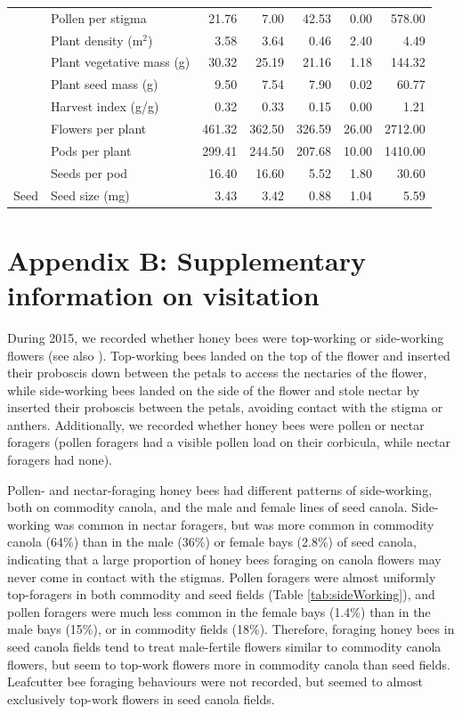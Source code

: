 \begin{table}
\begin{tabular}{l|l|r|r|r|r|r}
\cline{2-7}
 & Pollen per stigma & 21.76 & 7.00 & 42.53 & 0.00 & 578.00\\
\cline{2-7}
 & Plant density (m$^2$) & 3.58 & 3.64 & 0.46 & 2.40 & 4.49\\
\cline{2-7}
 & Plant vegetative mass (g) & 30.32 & 25.19 & 21.16 & 1.18 & 144.32\\
\cline{2-7}
 & Plant seed mass (g) & 9.50 & 7.54 & 7.90 & 0.02 & 60.77\\
\cline{2-7}
 & Harvest index (g/g) & 0.32 & 0.33 & 0.15 & 0.00 & 1.21\\
\cline{2-7}
 & Flowers per plant & 461.32 & 362.50 & 326.59 & 26.00 & 2712.00\\
\cline{2-7}
 & Pods per plant & 299.41 & 244.50 & 207.68 & 10.00 & 1410.00\\
\cline{2-7}
 & Seeds per pod & 16.40 & 16.60 & 5.52 & 1.80 & 30.60\\
\cline{2-7}
\multirow{-15}{*}{\raggedright\arraybackslash Seed} & Seed size (mg) & 3.43 & 3.42 & 0.88 & 1.04 & 5.59\\
\hline
\end{tabular}

\label{tab:dataSummary}
\end{table}

\clearpage

\section*{Appendix B: Supplementary information on visitation}

During 2015, we recorded whether honey bees were top-working or side-working flowers (see also \citealp{free1973, free1983, mohr1988}).
Top-working bees landed on the top of the flower and inserted their proboscis down between the petals to access the nectaries of the flower, while side-working bees landed on the side of the flower and stole nectar by inserted their proboscis between the petals, avoiding contact with the stigma or anthers. 
Additionally, we recorded whether honey bees were pollen or nectar foragers (pollen foragers had a visible pollen load on their corbicula, while nectar foragers had none).

Pollen- and nectar-foraging honey bees had different patterns of side-working, both on commodity canola, and the male and female lines of seed canola.
Side-working was common in nectar foragers, but was more common in commodity canola (64\%) than in the male (36\%) or female bays (2.8\%) of seed canola, indicating that a large proportion of honey bees foraging on canola flowers may never come in contact with the stigmas.
Pollen foragers were almost uniformly top-foragers in both commodity and seed fields (Table \ref{tab:sideWorking}), and pollen foragers were much less common in the female bays (1.4\%) than in the male bays (15\%), or in commodity fields (18\%).
Therefore, foraging honey bees in seed canola fields tend to treat male-fertile flowers similar to commodity canola flowers, but seem to top-work flowers more in commodity canola than seed fields.
Leafcutter bee foraging behaviours were not recorded, but seemed to almost exclusively top-work flowers in seed canola fields.

